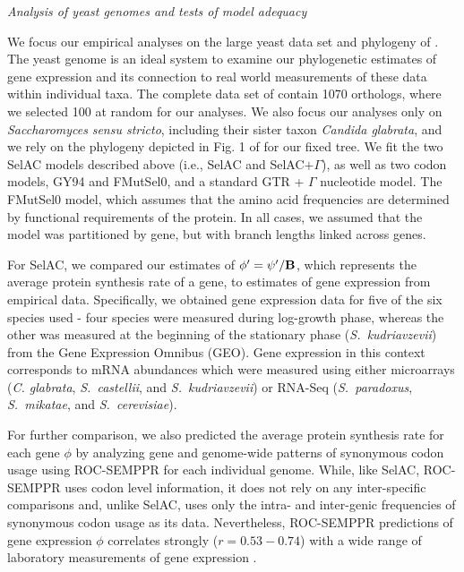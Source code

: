 \documentclass[12pt,letterpaper]{article}
\renewcommand{\subsection}[1]{%
\bigskip
\begin{center}
\begin{large}
\normalfont\itshape #1
\end{large}
\end{center}}
\newcommand{\Func}{\ensuremath{\text{\textbf{B}}}\xspace}
\newcommand{\selac}{SelAC\xspace}
\newcommand{\selacplusgamma}{SelAC$+\Gamma$\xspace}
\newcommand{\phiprime}{\ensuremath{\phi^\prime}\xspace}
\newcommand{\psiprime}{\ensuremath{\psi^\prime}\xspace}
\begin{document}
\subsection{Analysis of yeast genomes and tests of model adequacy} \label{sec:analysis}
We focus our empirical analyses on the large yeast data set and phylogeny of \citet{SalichosAndRokas2013}.
The yeast genome is an ideal system to examine our phylogenetic estimates of gene expression and its connection to real world measurements of these data within individual taxa.
The complete data set of \citet{SalichosAndRokas2013} contain 1070 orthologs, where we selected 100 at random for our analyses.
We also focus our analyses only on \emph{Saccharomyces} \emph{sensu stricto}, including their sister taxon \emph{Candida glabrata}, and we rely on the phylogeny depicted in Fig. 1 of \citet{SalichosAndRokas2013} for our fixed tree.
We fit the two \selac models described above (i.e., \selac and \selacplusgamma), as well as two codon models, GY94 and FMutSel0, and a standard GTR + $\Gamma$ nucleotide model.
The FMutSel0 model, which assumes that the amino acid frequencies are determined by functional requirements of the protein.
In all cases, we assumed that the model was partitioned by gene, but with branch lengths linked across genes.

For \selac, we compared our estimates of $\phiprime = \psiprime/\Func$, which represents the average protein synthesis rate of a gene, to estimates of gene expression from empirical data.
Specifically, we obtained gene expression data for five of the six species used - four species were measured during log-growth phase, whereas the other was measured at the beginning of the stationary phase (\emph{S.~kudriavzevii}) from the Gene Expression Omnibus (GEO).
Gene expression in this context corresponds to mRNA abundances which were measured using either microarrays (\emph{C. glabrata}, \emph{S.~castellii}, and \emph{S.~kudriavzevii}) or RNA-Seq (\emph{S.~paradoxus}, \emph{S.~mikatae}, and \emph{S.~cerevisiae}).

For further comparison, we also predicted the average protein synthesis rate for each gene $\phi$ by analyzing gene and genome-wide patterns of synonymous codon usage using ROC-SEMPPR \citep{GilchristEtAl2015} for each individual genome.
While, like \selac, ROC-SEMPPR uses codon level information, it does not rely on any inter-specific comparisons and, unlike \selac, uses only the intra- and inter-genic frequencies of synonymous codon usage as its data.
Nevertheless, ROC-SEMPPR predictions of gene expression $\phi$ correlates strongly ($r = 0.53-0.74$) with a wide range of laboratory measurements of gene expression \citep{GilchristEtAl2015}.
\end{document}
